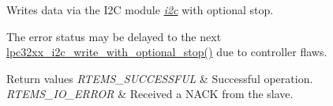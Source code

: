 Writes data via the I2C module {\itshape \mbox{\hyperlink{structi2c}{i2c}}} with optional stop. 

The error status may be delayed to the next \mbox{\hyperlink{group__lpc32xx__i2c_gaa9648954851cae9bfb3a08716c2f8e99}{lpc32xx\+\_\+i2c\+\_\+write\+\_\+with\+\_\+optional\+\_\+stop()}} due to controller flaws.


\begin{DoxyRetVals}{Return values}
{\em R\+T\+E\+M\+S\+\_\+\+S\+U\+C\+C\+E\+S\+S\+F\+UL} & Successful operation. \\
\hline
{\em R\+T\+E\+M\+S\+\_\+\+I\+O\+\_\+\+E\+R\+R\+OR} & Received a N\+A\+CK from the slave. \\
\hline
\end{DoxyRetVals}
